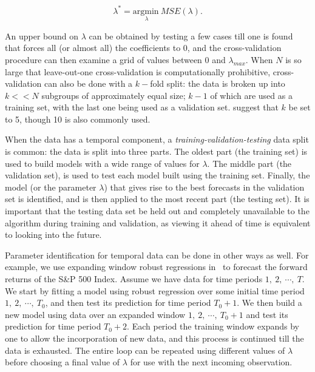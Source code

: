 \documentclass[graybox,envcountchap,sectrefs]{svmono}\usepackage[]{graphicx}\usepackage[]{xcolor}
\begin{document}
\begin{appendices}
\begin{equation}
\lambda^{*}=\underset{\lambda}{\mathrm{argmin}\ }MSE\left(\lambda\right).\label{eq:OptimalLambda}
\end{equation}

An upper bound on $\lambda$ can be obtained by testing a few cases
till one is found that forces all (or almost all) the coefficients
to 0, and the cross-validation procedure can then examine a grid of
values between 0 and $\lambda_{max}$. When $N$ is so large that
leave-out-one cross-validation is computationally prohibitive, cross-validation
can also be done with a $k-$fold split: the data is broken up into
$k<<N$ subgroups of approximately equal size; $k-1$ of which are
used as a training set, with the last one being used as a validation
set. \citet{BreimanSpector1992} suggest that $k$ be set to 5, though
10 is also commonly used. 

When the data has a temporal component, a \emph{training-validation-testing}
data split is common: the data is split into three parts. The oldest
part (the training set) is used to build models with a wide range
of values for $\lambda$. The middle part (the validation set), is
used to test each model built using the training set. Finally, the
model (or the parameter $\lambda$) that gives rise to the best forecasts
in the validation set is identified, and is then applied to the most
recent part (the testing set). It is important that the testing data
set be held out and completely unavailable to the algorithm during
training and validation, as viewing it ahead of time is equivalent
to looking into the future.

Parameter identification for temporal data can be done in other ways
as well. For example, we use expanding window robust regressions in
\ExpectedReturnChapter\ to forecast the forward returns of the S\&P
500 Index. Assume we have data for time periods $1,\ 2,\ \cdots,\ T$.
We start by fitting a model using robust regression over some initial
time period $1,\ 2,\ \cdots,\ T_{0}$, and then test its prediction
for time period $T_{0}+1$. We then build a new model using data over
an expanded window $1,\ 2,\ \cdots,\ T_{0}+1$ and test its prediction
for time period $T_{0}+2$. Each period the training window expands
by one to allow the incorporation of new data, and this process is
continued till the data is exhausted. The entire loop can be repeated
using different values of $\lambda$ before choosing a final value
of $\lambda$ for use with the next incoming observation. 



\end{appendices}
\end{document}
